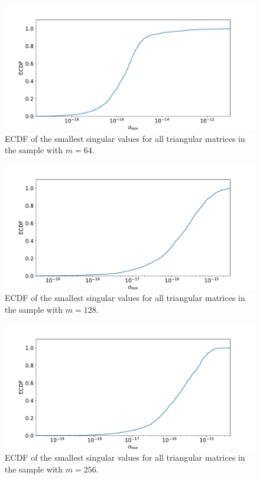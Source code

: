 \documentclass[a4paper, 11pt]{article}
\begin{document}
\begin{figure}
  \centering
  \includegraphics[width=\textwidth]{../2/triangular/ecdf/64.pdf}
  \caption{ECDF of the smallest singular values for all triangular matrices in
  the sample with $m=64$.}
  \label{fig:sigma_min_triangular_ECDF_64}
\end{figure}
\begin{figure}
  \centering
  \includegraphics[width=\textwidth]{../2/triangular/ecdf/128.pdf}
  \caption{ECDF of the smallest singular values for all triangular matrices in
  the sample with $m=128$.}
  \label{fig:sigma_min_triangular_ECDF_128}
\end{figure}
\begin{figure}
  \centering
  \includegraphics[width=\textwidth]{../2/triangular/ecdf/256.pdf}
  \caption{ECDF of the smallest singular values for all triangular matrices in
  the sample with $m=256$.}
  \label{fig:sigma_min_triangular_ECDF_256}
\end{figure}
\end{document}
